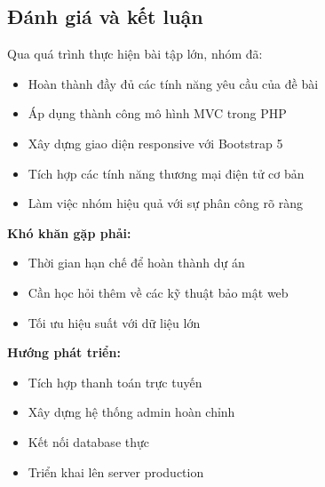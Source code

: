 \subsection{Đánh giá và kết luận}

Qua quá trình thực hiện bài tập lớn, nhóm đã:

\begin{itemize}
    \item Hoàn thành đầy đủ các tính năng yêu cầu của đề bài
    \item Áp dụng thành công mô hình MVC trong PHP
    \item Xây dựng giao diện responsive với Bootstrap 5
    \item Tích hợp các tính năng thương mại điện tử cơ bản
    \item Làm việc nhóm hiệu quả với sự phân công rõ ràng
\end{itemize}

\textbf{Khó khăn gặp phải:}
\begin{itemize}
    \item Thời gian hạn chế để hoàn thành dự án
    \item Cần học hỏi thêm về các kỹ thuật bảo mật web
    \item Tối ưu hiệu suất với dữ liệu lớn
\end{itemize}

\textbf{Hướng phát triển:}
\begin{itemize}
    \item Tích hợp thanh toán trực tuyến
    \item Xây dựng hệ thống admin hoàn chỉnh
    \item Kết nối database thực
    \item Triển khai lên server production
\end{itemize}
